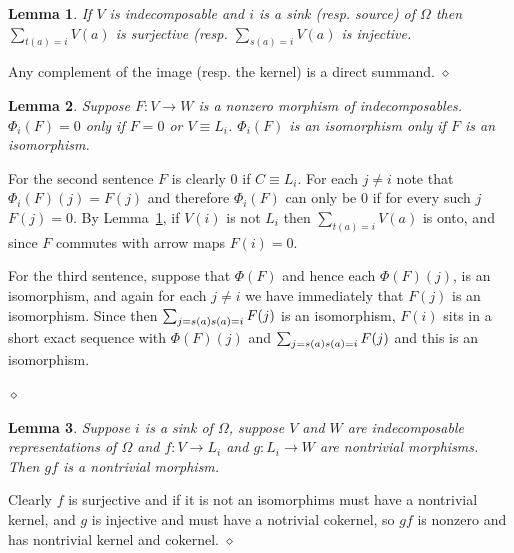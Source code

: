 \documentclass{article}
\newcommand{\maps}{:}
\newtheorem{lemma}{Lemma}[section]
\newenvironment{proof}{\vspace*{2ex}\noindent {\em Proof:}
}{\hfill $\diamond$ \\[2ex]}
\begin{document}
\begin{lemma} \label{lm:representative}
 If $V$ is indecomposable and $i$ is a sink (resp. source) of $\Omega$ then $\sum_{t(a)=i} V(a)$ is surjective (resp. $\sum_{s(a)=i} V(a)$ is injective.
\end{lemma}

\begin{proof}
    Any complement of the image (resp. the kernel) is a direct summand.
\end{proof}

\begin{lemma} \label{lm:reflection-nontrivial}
  Suppose $F \maps V \to W$ is a nonzero morphism of indecomposables.  $\Phi_i(F)=0$  only if $F=0$ or $V \equiv L_i$.  $\Phi_i(F)$ is an isomorphism  only if $F$ is an isomorphism.
\end{lemma}

\begin{proof}
  For the second sentence $F$ is clearly $0$ if $C \equiv L_i$.  For each $j \neq i$ note that $\Phi_i(F)(j)= F(j)$ and therefore $\Phi_i(F)$ can only be $0$ if for every such $j$ $F(j)= 0$.  By Lemma~\ref{lm:representative}, if $V(i)$ is not $L_i$ then  $\sum_{t(a)=i} V(a)$ is onto, and since $F$ commutes with arrow maps $F(i)=0$.

  For the third sentence, suppose that $\Phi(F)$ and hence each $\Phi(F)(j)$, is an isomorphism, and again  for each $j \neq i$ we have immediately that $F(j)$ is an isomorphism.  Since then $\sum_{j=s(a)\\s(a)=i} F(j)$ is an isomorphism, $F(i)$ sits in a short exact sequence with $\Phi(F)(j)$ and $\sum_{j=s(a)\\s(a)=i} F(j)$ and this is an isomorphism.
  
\end{proof}


\begin{lemma} \label{lm:no-irred}
  Suppose $i$ is a sink of $\Omega$, suppose $V$ and $W$ are indecomposable representations of $\Omega$ and $f \maps V \to L_i$ and $g \maps L_i \to W$ are nontrivial morphisms.  Then $gf$ is a nontrivial morphism.  
\end{lemma}

\begin{proof}
  Clearly $f$ is surjective and if it is not an isomorphims must have a nontrivial kernel, and $g$ is injective and must have a notrivial cokernel, so $gf$ is nonzero and has nontrivial kernel and cokernel.
\end{proof}
\end{document}
